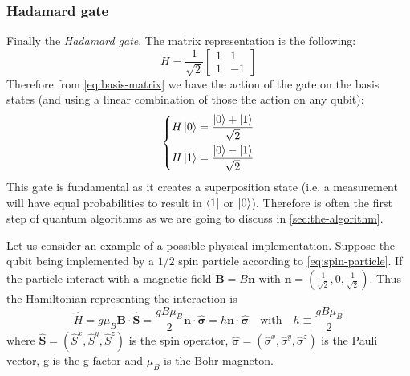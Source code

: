 \subsubsection{Hadamard gate}
Finally the \emph{Hadamard gate}. The matrix representation is the following:
\begin{equation}\label{eq:hadamard-gate}
    H = \frac{1}{\sqrt{2}}
    \begin{bmatrix}
    1 & 1\\
    1 & -1
    \end{bmatrix}
\end{equation}
Therefore from \eqref{eq:basis-matrix} we have the action of the gate on the basis states (and using a linear combination of those the action on any qubit):
\begin{equation}
\left\{
\begin{aligned}
    H\ket{0} &= \frac{\ket{0} + \ket{1}}{\sqrt{2}} \\
    H\ket{1} &= \frac{\ket{0} - \ket{1}}{\sqrt{2}}
\end{aligned}
\right.
\end{equation}
This gate is fundamental as it creates a superposition state (i.e. a measurement will have equal probabilities to result in $\bra{1}$ or $\ket{0}$). Therefore is often the first step of quantum algorithms as we are going to discuss in \ref{sec:the-algorithm}.

Let us consider an example of a possible physical implementation. Suppose the qubit being implemented by a $1/2$ spin particle according to \eqref{eq:spin-particle}. If the particle interact with a magnetic field $\boldsymbol{B} = B\boldsymbol{n}$ with $\boldsymbol{n} = (\frac{1}{\sqrt{2}}, 0, \frac{1}{\sqrt{2}})$. Thus the Hamiltonian representing the interaction is
\begin{equation*}
    \hat{H} = g\mu_B \boldsymbol{B} \cdot \hat{\boldsymbol{S}} = \frac{gB\mu_B}{2} \boldsymbol{n} \cdot \hat{\boldsymbol{\sigma}} = h \boldsymbol{n} \cdot \hat{\boldsymbol{\sigma}} \quad \text{with} \quad h \equiv \frac{gB\mu_B}{2}
\end{equation*}
where $\hat{\boldsymbol{S}} = (\hat{S}^x, \hat{S}^y, \hat{S}^z)$ is the spin operator, $\hat{\boldsymbol{\sigma}} = (\hat{\sigma}^x, \hat{\sigma}^y, \hat{\sigma}^z)$ is the Pauli vector, g is the g-factor and $\mu_B$ is the Bohr magneton.

